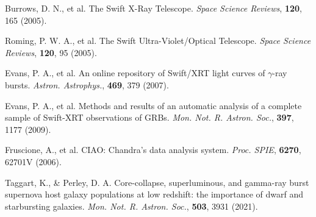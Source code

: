 \documentclass{nature_plusfigure}
\newcommand{\mn}{{Mon. Not. R. Astron. Soc.}}
\newcommand{\mnras}{\mn}
\newcommand{\apj}{{Astrophys. J.}}
\newcommand{\aap}{{Astron. Astrophys.}}
\newcommand{\procspie}{Proc. SPIE}
\newcommand{\ssr}{Space Science Reviews}
\begin{document}
\begin{methods}
\begin{thebibliography}{10}

 Burrows, D. N., et al. The Swift X-Ray Telescope. \emph{\ssr}, \textbf{120}, 165 (2005). 

 Roming, P. W. A., et al. The Swift Ultra-Violet/Optical Telescope. \emph{\ssr}, \textbf{120}, 95 (2005).

 Evans, P. A., et al. An online repository of Swift/XRT light curves of $\gamma$-ray bursts. \emph{\aap}, \textbf{469}, 379 (2007). 

 Evans, P. A., et al. Methods and results of an automatic analysis of a complete sample of Swift-XRT observations of GRBs. \emph{\mnras}, \textbf{397}, 1177 (2009). 

 Fruscione, A., et al. CIAO: Chandra's data analysis system. \emph{\procspie}, \textbf{6270}, 62701V (2006). 


 Taggart, K., \& Perley, D. A. Core-collapse, superluminous, and gamma-ray burst supernova host galaxy populations at low redshift: the importance of dwarf and starbursting galaxies. \emph{\mnras}, \textbf{503}, 3931 (2021). 


%
%
%

\end{thebibliography}

\end{methods}

\clearpage
\end{document}
